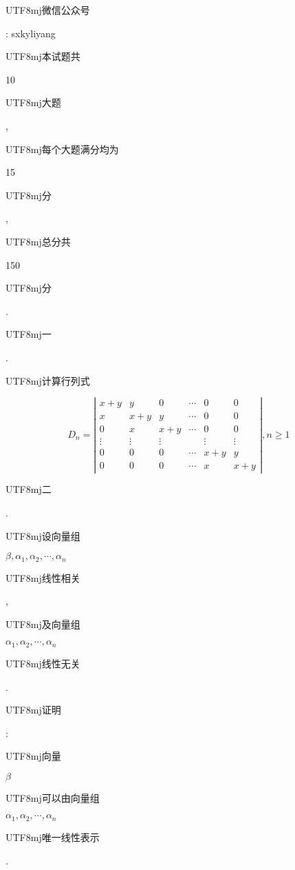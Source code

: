 \documentclass[10pt]{article}
\begin{document}
\begin{CJK}{UTF8}{mj}微信公众号\end{CJK}: sxkyliyang

\begin{CJK}{UTF8}{mj}本试题共\end{CJK} 10 \begin{CJK}{UTF8}{mj}大题\end{CJK}, \begin{CJK}{UTF8}{mj}每个大题满分均为\end{CJK} 15 \begin{CJK}{UTF8}{mj}分\end{CJK}, \begin{CJK}{UTF8}{mj}总分共\end{CJK} 150 \begin{CJK}{UTF8}{mj}分\end{CJK}.

\begin{CJK}{UTF8}{mj}一\end{CJK}. \begin{CJK}{UTF8}{mj}计算行列式\end{CJK}
$$
D_{n}=\left|\begin{array}{cccccc}
x+y & y & 0 & \cdots & 0 & 0 \\
x & x+y & y & \cdots & 0 & 0 \\
0 & x & x+y & \cdots & 0 & 0 \\
\vdots & \vdots & \vdots & & \vdots & \vdots \\
0 & 0 & 0 & \cdots & x+y & y \\
0 & 0 & 0 & \cdots & x & x+y
\end{array}\right|, n \geqslant 1
$$
\begin{CJK}{UTF8}{mj}二\end{CJK}. \begin{CJK}{UTF8}{mj}设向量组\end{CJK} $\beta, \alpha_{1}, \alpha_{2}, \cdots, \alpha_{n}$ \begin{CJK}{UTF8}{mj}线性相关\end{CJK}, \begin{CJK}{UTF8}{mj}及向量组\end{CJK} $\alpha_{1}, \alpha_{2}, \cdots, \alpha_{n}$ \begin{CJK}{UTF8}{mj}线性无关\end{CJK}. \begin{CJK}{UTF8}{mj}证明\end{CJK}: \begin{CJK}{UTF8}{mj}向量\end{CJK} $\beta$ \begin{CJK}{UTF8}{mj}可以由向量组\end{CJK} $\alpha_{1}, \alpha_{2}, \cdots, \alpha_{n}$ \begin{CJK}{UTF8}{mj}唯一线性表示\end{CJK}.
\end{document}
